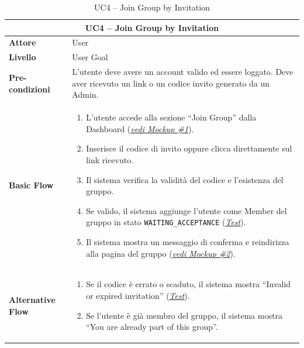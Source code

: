 \begin{table}[htbp]
    \centering
    \footnotesize
    \begin{tabularx}{\textwidth}{|l|X|}
        \hline
        \multicolumn{2}{|c|}{\textbf{UC4 -- Join Group by Invitation}} \\
        \hline
        \textbf{Attore} & User \\
        \hline
        \textbf{Livello} & User Goal \\
        \hline
        \textbf{Pre-condizioni} & L'utente deve avere un account valido ed essere loggato. Deve aver ricevuto un link o un codice invito generato da un Admin. \\
        \hline
        \textbf{Basic Flow} & 
        \begin{enumerate}[leftmargin=*, nosep, topsep=3pt]
            \item L'utente accede alla sezione ``Join Group'' dalla Dashboard (\hyperref[fig:dashboard]{\textit{vedi Mockup \#1}}).
            \item Inserisce il codice di invito oppure clicca direttamente sul link ricevuto.
            \item Il sistema verifica la validità del codice e l'esistenza del gruppo.
            \item Se valido, il sistema aggiunge l'utente come Member del gruppo in stato \texttt{WAITING\_ACCEPTANCE} (\hyperref[test:uc4_join]{\textit{Test}}).
            \item Il sistema mostra un messaggio di conferma e reindirizza alla pagina del gruppo (\hyperref[fig:group_details]{\textit{vedi Mockup \#2}}).
        \end{enumerate} \\
        \hline
        \textbf{Alternative Flow} & 
        \begin{enumerate}[label=3\alph*., leftmargin=*, nosep, topsep=3pt]
            \item Se il codice è errato o scaduto, il sistema mostra ``Invalid or expired invitation'' (\hyperref[test:uc4_invalid_code]{\textit{Test}}).
            \item Se l'utente è già membro del gruppo, il sistema mostra ``You are already part of this group''.
        \end{enumerate} \\
        \hline
    \end{tabularx}
    \caption{UC4 -- Join Group by Invitation}
    \label{tab:uc4}
\end{table}

